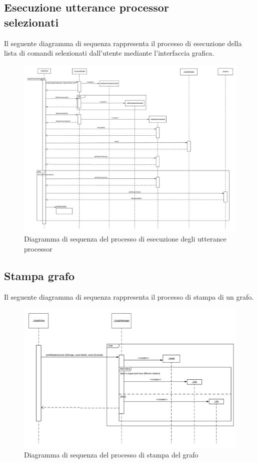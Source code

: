 \documentclass[openany,12pt,a4paper]{report}
\begin{document}
	\subsection{Esecuzione utterance processor \\ selezionati}
	
	Il seguente diagramma di sequenza rappresenta il processo di esecuzione della lista di comandi selezionati dall'utente mediante l'interfaccia grafica.
	
	\begin{figure}[H]
		\hspace*{-30mm}
		\includegraphics[scale=0.47]{EsecuzioneProcessor}
		\centering
		\caption{Diagramma di sequenza del processo di esecuzione degli utterance processor}
	\end{figure}

	\newpage
	
	\subsection{Stampa grafo}
	
	Il seguente diagramma di sequenza rappresenta il processo di stampa di un grafo.
	
	\begin{figure}[H]
		\hspace*{-25mm}
		\includegraphics[scale=0.67]{StampaGrafo}
		\centering
		\caption{Diagramma di sequenza del processo di stampa del grafo}
	\end{figure}
	
\end{document}
